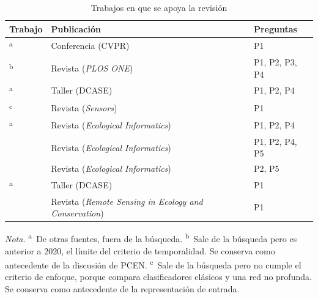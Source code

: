 \begin{table}[htbp]
    \centering
    \begin{threeparttable}
        \caption{Trabajos en que se apoya la revisión}
        \label{tab:estudios}
        \small
        \begin{tabular}{@{}L{5.4cm}L{5.0cm}l@{}}
            \toprule
            \textbf{Trabajo} & \textbf{Publicación} & \textbf{Preguntas} \\
            \midrule
            \citet{he_deep_2016}\textsuperscript{a} & Conferencia (CVPR) & P1 \\
            \citet{lostanlen_robust_2019}\textsuperscript{b} & Revista (\textit{PLOS ONE}) & P1, P2, P3, P4 \\
            \citet{politis_dataset_2020}\textsuperscript{a} & Taller (DCASE) & P1, P2, P4 \\
            \citet{bonet-sola_comparative_2021}\textsuperscript{c} & Revista (\textit{Sensors}) & P1 \\
            \citet{kahl_birdnet_2021}\textsuperscript{a} & Revista (\textit{Ecological Informatics}) & P1, P2, P4 \\
            \citet{nolasco_learning_2023} & Revista (\textit{Ecological Informatics}) & P1, P2, P4, P5 \\
            \citet{kath_leveraging_2024} & Revista (\textit{Ecological Informatics}) & P2, P5 \\
            \citet{zhu_sound_2025}\textsuperscript{a} & Taller (DCASE) & P1 \\
            \citet{Campos_Krofel_Rio-Maior_Renna_2025} & Revista (\textit{Remote Sensing in Ecology and Conservation}) & P1 \\
            \bottomrule
        \end{tabular}
        \begin{tablenotes}[flushleft]
            \footnotesize
            \item \textit{Nota.} \textsuperscript{a}~De otras fuentes, fuera de la
            búsqueda. \textsuperscript{b}~Sale de la búsqueda pero es anterior a
            2020, el límite del criterio de temporalidad. Se conserva como
            antecedente de la discusión de PCEN. \textsuperscript{c}~Sale de la
            búsqueda pero no cumple el criterio de enfoque, porque compara
            clasificadores clásicos y una red no profunda. Se conserva como
            antecedente de la representación de entrada.
        \end{tablenotes}
    \end{threeparttable}
\end{table}

